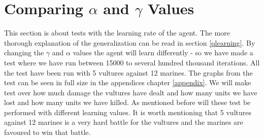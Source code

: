 \section{Comparing $\alpha$ and $\gamma$ Values}
This section is about tests with the learning rate of the agent. The more thorough explanation of the generalization can be read in section \ref{qlearning}.
By changing the $\gamma$ and $\alpha$ values the agent will learn differently - so we have made a test where we have run between 15000 to several hundred thousand iterations. All the test have been run with 5 vultures against 12 marines. The graphs from the test can be seen in full size in the appendices chapter \ref{appendix}. We will make test over how much damage the vultures have dealt and how many units we have lost and how many units we have killed. As mentioned before will these test be performed with different learning values. It is worth mentioning that 5 vultures against 12 marines is a very hard battle for the vultures and the marines are favoured to win that battle.


